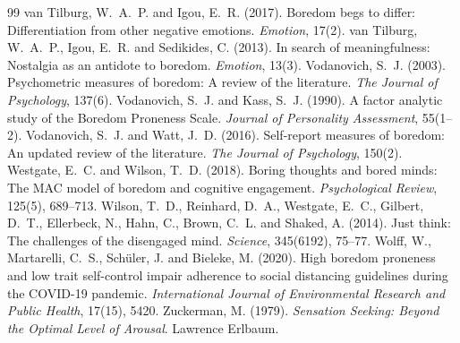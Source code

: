 \documentclass{situationist-preprint}
\begin{document}
\begin{thebibliography}{99}
 van Tilburg, W.~A.~P. and Igou, E.~R. (2017). Boredom begs to differ: Differentiation from other negative emotions. \emph{Emotion}, 17(2).
 van Tilburg, W.~A.~P., Igou, E.~R. and Sedikides, C. (2013). In search of meaningfulness: Nostalgia as an antidote to boredom. \emph{Emotion}, 13(3).
 Vodanovich, S.~J. (2003). Psychometric measures of boredom: A review of the literature. \emph{The Journal of Psychology}, 137(6).
 Vodanovich, S.~J. and Kass, S.~J. (1990). A factor analytic study of the Boredom Proneness Scale. \emph{Journal of Personality Assessment}, 55(1--2).
 Vodanovich, S.~J. and Watt, J.~D. (2016). Self-report measures of boredom: An updated review of the literature. \emph{The Journal of Psychology}, 150(2).
 Westgate, E.~C. and Wilson, T.~D. (2018). Boring thoughts and bored minds: The MAC model of boredom and cognitive engagement. \emph{Psychological Review}, 125(5), 689--713.
 Wilson, T.~D., Reinhard, D.~A., Westgate, E.~C., Gilbert, D.~T., Ellerbeck, N., Hahn, C., Brown, C.~L. and Shaked, A. (2014). Just think: The challenges of the disengaged mind. \emph{Science}, 345(6192), 75--77.
 Wolff, W., Martarelli, C.~S., Sch{\"u}ler, J. and Bieleke, M. (2020). High boredom proneness and low trait self-control impair adherence to social distancing guidelines during the COVID-19 pandemic. \emph{International Journal of Environmental Research and Public Health}, 17(15), 5420.
 Zuckerman, M. (1979). \emph{Sensation Seeking: Beyond the Optimal Level of Arousal}. Lawrence Erlbaum.
\end{thebibliography}
\end{document}
